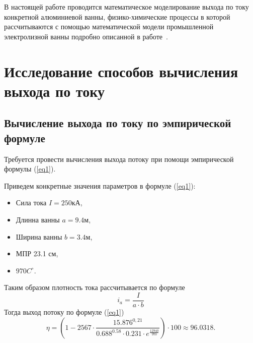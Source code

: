 \documentclass{article}
\begin{document}
В настоящей работе проводится математическое моделирование выхода по току конкретной алюминиевой ванны, физико-химические процессы в которой рассчитываются с помощью математической модели промышленной электролизной ванны подробно описанной в работе~\cite{litlink:kalmykov}.

\section{Исследование способов вычисления выхода по току}

\subsection{Вычисление выхода по току по эмпирической формуле}
Требуется провести вычисления выхода потоку при помощи эмпирической формулы (\ref{eq1}).

Приведем конкретные значения параметров в формуле (\ref{eq1}):
\begin{itemize}
\item Сила тока $I=250 $кА,
\item Длинна ванны $a=9.4$м,
\item Ширина ванны $b=3.4$м,
\item МПР 23.1 см,
\item $970 C^{\circ}$.
\end{itemize}
Таким образом плотность тока рассчитывается по формуле
\begin{equation}
i_a = \frac{I}{a \cdot b}
\end{equation}
Тогда выход потоку по формуле (\ref{eq1})
\begin{equation}
\eta=(1-2567 \cdot \frac{15.876^{0,21}}{0.688^{0.58} \cdot 0.231 \cdot e^{\frac{12940}{970}}}) \cdot 100 \approx 96.0318.
\end{equation}
\end{document}
